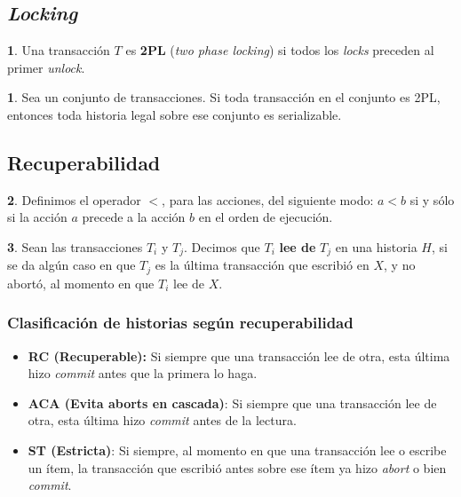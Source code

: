 \documentclass[english]{article}
\theoremstyle{definition}
\theoremstyle{definition}
\newtheorem*{defn*}{\protect\definitionname}
\providecommand{\definitionname}{Definición}
\newtheorem*{thm*}{\protect\theoremname}
\providecommand{\theoremname}{Teorema}
\begin{document}
\subsection{\emph{Locking}}

\begin{defn*}
Una transacción $T$ es \textbf{2PL} (\emph{two phase locking}) si todos los
\emph{locks} preceden al primer \emph{unlock}.
\end{defn*}

\begin{thm*}
Sea un conjunto de transacciones. Si toda transacción en el conjunto es 2PL,
entonces toda historia legal sobre ese conjunto es serializable.
\end{thm*}

\subsection{Recuperabilidad}

\begin{defn*}
Definimos el operador $<$, para las acciones, del siguiente modo:
$a < b$ si y sólo si la acción $a$ precede a la acción $b$ en el orden de
ejecución.
\end{defn*}

\begin{defn*}
Sean las transacciones $T_i$ y $T_j$. Decimos que $T_i$ \textbf{lee de} $T_j$
en una historia $H$, si se da algún caso en que $T_j$ es la última transacción
que escribió en $X$, y no abortó, al momento en que $T_i$ lee de $X$.

\end{defn*}

\subsubsection{Clasificación de historias según recuperabilidad}
\begin{itemize}
	\item \textbf{RC (Recuperable):} Si siempre que una transacción lee de
        otra, esta última hizo \emph{commit} antes que la primera lo haga.
    \item \textbf{ACA (Evita aborts en cascada)}: Si siempre que una
        transacción lee de otra, esta última hizo \emph{commit} antes de la
        lectura.
    \item \textbf{ST (Estricta)}: Si siempre, al momento en que una
        transacción lee o escribe un ítem, la transacción que escribió antes
        sobre ese ítem ya hizo \emph{abort} o bien \emph{commit}.
\end{itemize}
\end{document}
